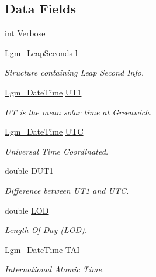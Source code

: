 \subsection*{Data Fields}
\begin{CompactItemize}
\item 
int \hyperlink{struct_lgm___c_trans_95f627d7054b1abbffa2c6ea19bf05db}{Verbose}
\item 
\hyperlink{struct_lgm___leap_seconds}{Lgm\_\-LeapSeconds} \hyperlink{struct_lgm___c_trans_0228728c0f932a0af4566cdf20868cd4}{l}
\begin{CompactList}\small\item\em Structure containing Leap Second Info. \item\end{CompactList}\item 
\hyperlink{struct_lgm___date_time}{Lgm\_\-DateTime} \hyperlink{struct_lgm___c_trans_962e9f1b4229ffbb70a070090d8a021e}{UT1}
\begin{CompactList}\small\item\em UT is the mean solar time at Greenwich. \item\end{CompactList}\item 
\hyperlink{struct_lgm___date_time}{Lgm\_\-DateTime} \hyperlink{struct_lgm___c_trans_ffd6d677453dac5266c9172c6ff2d9b7}{UTC}
\begin{CompactList}\small\item\em Universal Time Coordinated. \item\end{CompactList}\item 
double \hyperlink{struct_lgm___c_trans_3711c22856595eb27022ddb8680cec06}{DUT1}
\begin{CompactList}\small\item\em Difference between UT1 and UTC. \item\end{CompactList}\item 
double \hyperlink{struct_lgm___c_trans_190ed8b9906021fb489dc2ee35881d8b}{LOD}
\begin{CompactList}\small\item\em Length Of Day (LOD). \item\end{CompactList}\item 
\hyperlink{struct_lgm___date_time}{Lgm\_\-DateTime} \hyperlink{struct_lgm___c_trans_c12a11b923b2dd78320f3b222f5b4b7c}{TAI}
\begin{CompactList}\small\item\em International Atomic Time. \item\end{CompactList}\item 

\end{CompactItemize}
